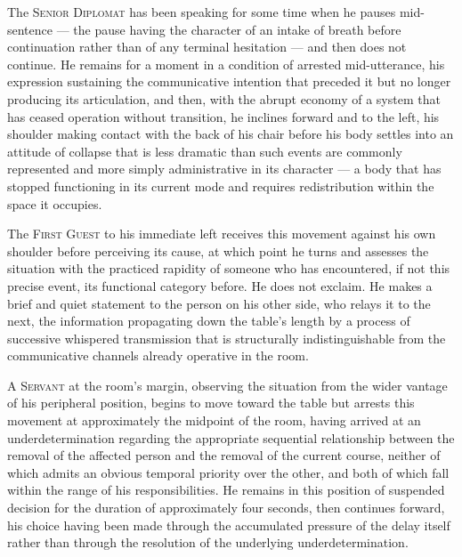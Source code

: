 \documentclass[12pt, oneside]{article}
\newenvironment{action}{%
  \vspace{0.6em}%
  \noindent\ignorespaces%
}{%
  \par\vspace{0.6em}%
}
\begin{document}
\begin{action}
The \textsc{Senior Diplomat} has been speaking for some time when he pauses mid-sentence --- the pause having the character of an intake of breath before continuation rather than of any terminal hesitation --- and then does not continue. He remains for a moment in a condition of arrested mid-utterance, his expression sustaining the communicative intention that preceded it but no longer producing its articulation, and then, with the abrupt economy of a system that has ceased operation without transition, he inclines forward and to the left, his shoulder making contact with the back of his chair before his body settles into an attitude of collapse that is less dramatic than such events are commonly represented and more simply administrative in its character --- a body that has stopped functioning in its current mode and requires redistribution within the space it occupies.

The \textsc{First Guest} to his immediate left receives this movement against his own shoulder before perceiving its cause, at which point he turns and assesses the situation with the practiced rapidity of someone who has encountered, if not this precise event, its functional category before. He does not exclaim. He makes a brief and quiet statement to the person on his other side, who relays it to the next, the information propagating down the table's length by a process of successive whispered transmission that is structurally indistinguishable from the communicative channels already operative in the room.

A \textsc{Servant} at the room's margin, observing the situation from the wider vantage of his peripheral position, begins to move toward the table but arrests this movement at approximately the midpoint of the room, having arrived at an underdetermination regarding the appropriate sequential relationship between the removal of the affected person and the removal of the current course, neither of which admits an obvious temporal priority over the other, and both of which fall within the range of his responsibilities. He remains in this position of suspended decision for the duration of approximately four seconds, then continues forward, his choice having been made through the accumulated pressure of the delay itself rather than through the resolution of the underlying underdetermination.
\end{action}
\end{document}
